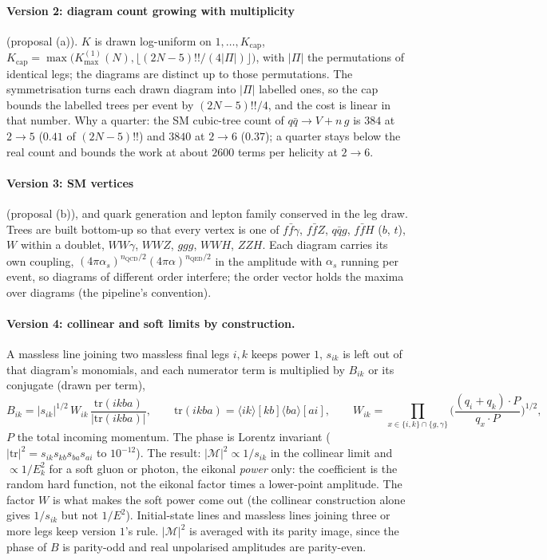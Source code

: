 \documentclass[11pt]{article}
\begin{document}
\paragraph{Version 2: diagram count growing with multiplicity} (proposal (a)). $K$ is drawn log-uniform on
$1,\dots,K_\text{cap}$, $K_\text{cap}=\max\big(K_\text{max}^{(1)}(N),\lfloor(2N-5)!!/(4|\Pi|)\rfloor\big)$, with $|\Pi|$ the
permutations of identical legs; the diagrams are distinct up to those permutations. The symmetrisation turns each drawn
diagram into $|\Pi|$ labelled ones, so the cap bounds the labelled trees per event by $(2N-5)!!/4$, and the cost is
linear in that number. Why a quarter: the SM cubic-tree count of $q\bar q\to V+n\,g$ is $384$ at $2\to5$ ($0.41$ of
$(2N-5)!!$) and $3840$ at $2\to6$ ($0.37$); a quarter stays below the real count and bounds the work at about $2600$
terms per helicity at $2\to6$.
\paragraph{Version 3: SM vertices} (proposal (b)), and quark generation and lepton family conserved in the leg draw.
Trees are built bottom-up so that every vertex is one of $f\bar f\gamma$, $f\bar fZ$, $q\bar qg$, $f\bar fH$ ($b$, $t$),
$W$ within a doublet, $WW\gamma$, $WWZ$, $ggg$, $WWH$, $ZZH$. Each diagram carries its own coupling,
$(4\pi\alpha_s)^{n_\text{QCD}/2}(4\pi\alpha)^{n_\text{QED}/2}$ in the amplitude with $\alpha_s$ running per event, so
diagrams of different order interfere; the order vector holds the maxima over diagrams (the pipeline's convention).
\paragraph{Version 4: collinear and soft limits by construction.} A massless line joining two massless final legs
$i,k$ keeps power $1$, $s_{ik}$ is left out of that diagram's monomials, and each numerator term is multiplied by $B_{ik}$
or its conjugate (drawn per term),
\begin{equation*}
  B_{ik}=|s_{ik}|^{1/2}\,W_{ik}\,\frac{\mathrm{tr}(ikba)}{|\mathrm{tr}(ikba)|},\qquad
  \mathrm{tr}(ikba)=\langle ik\rangle[kb]\langle ba\rangle[ai],\qquad
  W_{ik}=\prod_{x\in\{i,k\}\cap\{g,\gamma\}}\Big(\frac{(q_i+q_k)\cdot P}{q_x\cdot P}\Big)^{1/2},
\end{equation*}
$P$ the total incoming momentum. The phase is Lorentz invariant ($|\mathrm{tr}|^2=s_{ik}s_{kb}s_{ba}s_{ai}$ to $10^{-12}$).
The result: $|\mathcal M|^2\propto1/s_{ik}$ in the collinear limit and $\propto1/E_k^2$ for a soft gluon or photon, the
eikonal \emph{power} only: the coefficient is the random hard function, not the eikonal factor times a lower-point
amplitude. The factor $W$ is what makes the soft power come out (the collinear construction alone gives $1/s_{ik}$ but
not $1/E^2$). Initial-state lines and massless lines joining three or more legs keep version $1$'s rule. $|\mathcal M|^2$
is averaged with its parity image, since the phase of $B$ is parity-odd and real unpolarised amplitudes are
parity-even.
\end{document}

